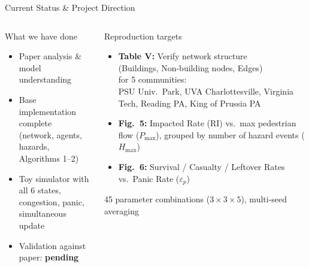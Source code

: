 \documentclass[aspectratio=169, xcolor=table]{beamer}
\begin{document}
\begin{frame}[t,shrink=8]{Current Status \& Project Direction}
\footnotesize

\begin{columns}[T,onlytextwidth]

\begin{block}{\small What we have done}
\scriptsize
\begin{itemize}\itemsep0.2em
  \item[$\checkmark$] Paper analysis \& model understanding
  \item[$\checkmark$] Base implementation complete\\
        {\tiny (network, agents, hazards, Algorithms 1--2)}
  \item[$\checkmark$] Toy simulator with all 6 states,\\
        congestion, panic, simultaneous update
  \item[$\circ$] Validation against paper: \textbf{pending}
\end{itemize}
\end{block}

\vspace{0.1em}
\begin{alertblock}{\small Reproduction targets}
\scriptsize
\begin{itemize}\itemsep0.2em
  \item \textbf{Table V:} Verify network structure\\
        (Buildings, Non-building nodes, Edges)\\
        for 5 communities:\\
        {\tiny PSU Univ.\ Park, UVA Charlottesville, Virginia Tech,
        Reading PA, King of Prussia PA}

  \item \textbf{Fig.\ 5:} Impacted Rate (RI) vs.\ max pedestrian flow ($P_{\max}$), grouped by number of hazard events ($H_{\max}$)

  \item \textbf{Fig.\ 6:} Survival / Casualty / Leftover Rates vs.\ Panic Rate ($\varepsilon_p$)
\end{itemize}
\vspace{0.1em}
{\tiny 45 parameter combinations ($3 \times 3 \times 5$), multi-seed averaging}
\end{alertblock}


\end{columns}
\end{frame}
\end{document}
